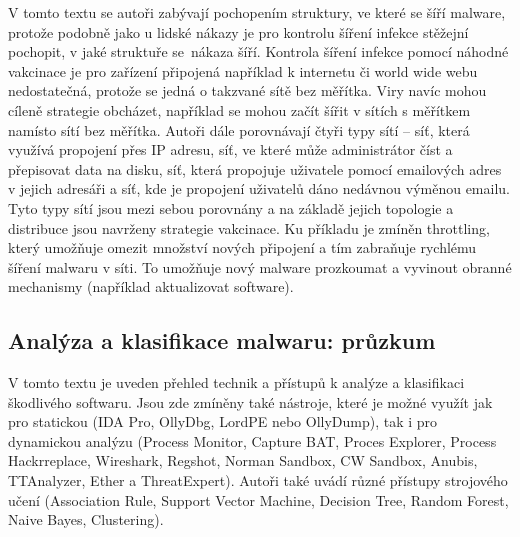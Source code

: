 V tomto textu se autoři \cite{stateOfArt6} zabývají pochopením struktury, ve které se šíří malware, protože podobně jako u lidské nákazy je pro kontrolu šíření infekce stěžejní pochopit, v jaké struktuře se~nákaza šíří. Kontrola šíření infekce pomocí náhodné vakcinace je pro zařízení připojená například k internetu či world wide webu nedostatečná, protože se jedná o takzvané sítě bez měřítka. Viry navíc mohou cíleně strategie obcházet, například se mohou začít šířit v sítích s měřítkem namísto sítí bez měřítka. Autoři dále porovnávají čtyři typy sítí – síť, která využívá propojení přes IP adresu, síť, ve které může administrátor číst a přepisovat data na disku, síť, která propojuje uživatele pomocí emailových adres v jejich adresáři a síť, kde je propojení uživatelů dáno nedávnou výměnou emailu. Tyto typy sítí jsou mezi sebou porovnány a na základě jejich topologie a distribuce jsou navrženy strategie vakcinace. Ku příkladu je zmíněn throttling, který umožňuje omezit množství nových připojení a tím zabraňuje rychlému šíření malwaru v síti. To umožňuje nový malware prozkoumat a vyvinout obranné mechanismy (například aktualizovat software).

\subsection{Analýza a klasifikace malwaru: průzkum}
\label{stateofArt7_zaklady}

V tomto textu \cite{stateOfArt7} je uveden přehled technik a přístupů k analýze a klasifikaci škodlivého softwaru. Jsou zde zmíněny také nástroje, které je možné využít jak pro statickou (IDA Pro, OllyDbg, LordPE nebo OllyDump), tak i pro dynamickou analýzu (Process Monitor, Capture BAT, Proces Explorer, Process Hackrreplace, Wireshark, Regshot, Norman Sandbox, CW Sandbox, Anubis, TTAnalyzer, Ether a ThreatExpert). Autoři také uvádí různé přístupy strojového učení (Association Rule, Support Vector Machine, Decision Tree, Random Forest, Naive Bayes, Clustering).